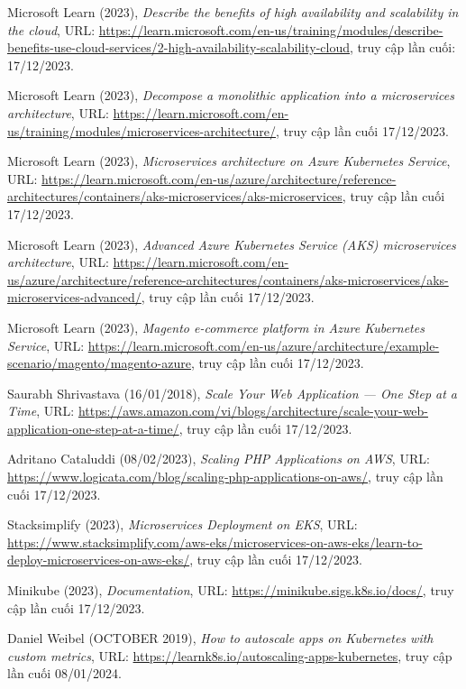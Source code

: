 \begin{thebibliography}{1}
Microsoft Learn (2023), \emph{Describe the benefits of high availability and scalability in the cloud}, URL: \url{https://learn.microsoft.com/en-us/training/modules/describe-benefits-use-cloud-services/2-high-availability-scalability-cloud}, truy cập lần cuối: 17/12/2023.

Microsoft Learn (2023), \emph{Decompose a monolithic application into a microservices architecture}, URL: \url{https://learn.microsoft.com/en-us/training/modules/microservices-architecture/}, truy cập lần cuối 17/12/2023.

Microsoft Learn (2023), \emph{Microservices architecture on Azure Kubernetes Service}, URL: \url{https://learn.microsoft.com/en-us/azure/architecture/reference-architectures/containers/aks-microservices/aks-microservices}, truy cập lần cuối 17/12/2023.


Microsoft Learn (2023), \emph{Advanced Azure Kubernetes Service (AKS) microservices architecture}, URL: \url{https://learn.microsoft.com/en-us/azure/architecture/reference-architectures/containers/aks-microservices/aks-microservices-advanced/}, truy cập lần cuối 17/12/2023.

Microsoft Learn (2023), \emph{Magento e-commerce platform in Azure Kubernetes Service}, URL: \url{https://learn.microsoft.com/en-us/azure/architecture/example-scenario/magento/magento-azure}, truy cập lần cuối 17/12/2023.

Saurabh Shrivastava (16/01/2018), \emph{Scale Your Web Application — One Step at a Time}, URL: \url{https://aws.amazon.com/vi/blogs/architecture/scale-your-web-application-one-step-at-a-time/}, truy cập lần cuối 17/12/2023.

Adritano Cataluddi (08/02/2023), \emph{Scaling PHP Applications on AWS}, URL: \url{https://www.logicata.com/blog/scaling-php-applications-on-aws/}, truy cập lần cuối 17/12/2023.

Stacksimplify (2023), \emph{Microservices Deployment on EKS}, URL: \url{https://www.stacksimplify.com/aws-eks/microservices-on-aws-eks/learn-to-deploy-microservices-on-aws-eks/}, truy cập lần cuối 17/12/2023.

Minikube (2023), \emph{Documentation}, URL: \url{https://minikube.sigs.k8s.io/docs/}, truy cập lần cuối 17/12/2023.

Daniel Weibel (OCTOBER 2019), \emph{How to autoscale apps on Kubernetes with custom metrics}, URL: \url{https://learnk8s.io/autoscaling-apps-kubernetes}, truy cập lần cuối 08/01/2024.

\end{thebibliography}